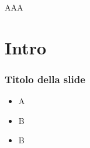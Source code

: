 \documentclass[aspectratio=169,11pt,hyperref={colorlinks=true}]{beamer}
\begin{document}

\begin{frame}[c]
  \begin{center}
      \color{white}
      \Huge AAA
  \end{center}
\end{frame}


\section{Intro}

\begin{frame}
  \frametitle{Titolo della slide}
    \begin{itemize}
        \item{A}
        \item{B}
        \item{B}
    \end{itemize}
\end{frame}
\end{document}

